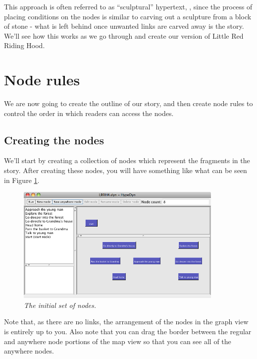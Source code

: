 \documentclass{article}
\begin{document}
This approach is often referred to as ``sculptural'' hypertext,
\cite{Bernstein:2001aa,Bernstein:2002aa}, since the process of placing conditions
on the nodes is similar to carving out a sculpture from a block of stone - what
is left behind once unwanted links are carved away is the story. We'll see how
this works as we go through and create our version of Little Red Riding Hood.

\section{Node rules}

We are now going to create the outline of our story, and then create node rules
to control the order in which readers can access the nodes.

\subsection{Creating the nodes}

We'll start by creating a collection of nodes which represent the fragments in
the story. After creating these nodes, you will have something like what can be
seen in Figure \ref{fig:tut3:initial_nodes}.

\begin{figure}[h]
  \centering \includegraphics[width=10cm]{images/hypedyn-tutorial-3-figure-2}
  \caption{\textit{The initial set of nodes.}}
  \label{fig:tut3:initial_nodes}
\end{figure} 

Note that, as there are no links, the arrangement of the nodes in the graph view
is entirely up to you. Also note that you can drag the border between the regular
and anywhere node portions of the map view so that you can see all of the
anywhere nodes.
\end{document}
